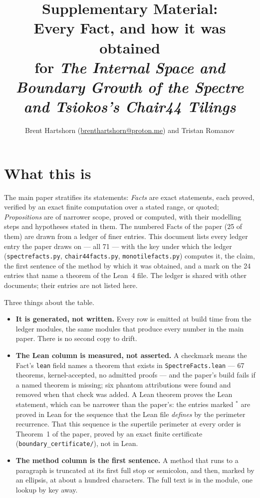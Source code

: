 \documentclass[10pt]{article}
\title{\vspace{-1cm}
\textbf{Supplementary Material:} \\ Every Fact, and how it was obtained \\
{\large for \emph{The Internal Space and Boundary Growth of the Spectre and Tsiokos's Chair44 Tilings}}}
\author{Brent Hartshorn \orcidlink{0009-0004-2853-655X}
        (\url{brenthartshorn@proton.me}) and Tristan Romanov}
\newcommand{\code}[1]{\texttt{#1}}
\begin{document}
\maketitle


\section*{What this is}

The main paper stratifies its statements: \emph{Facts} are exact statements,
each proved, verified by an exact finite computation over a stated range, or
quoted; \emph{Propositions} are of narrower scope, proved or computed, with their
modelling steps and hypotheses stated in them.  The numbered Facts of the
paper (25 of them) are drawn from a ledger of finer entries.  This document
lists every ledger entry the paper draws on --- all 71 --- with the key under
which the ledger (\code{spectrefacts.py}, \code{chair44facts.py},
\code{monotilefacts.py}) computes it, the claim, the first sentence of the
method by which it was obtained, and a mark on the 24 entries that name a
theorem of the Lean~4 file.  The ledger is shared with other documents; their
entries are not listed here.

Three things about the table.

\begin{itemize}
\item \textbf{It is generated, not written.}  Every row is emitted at build
  time from the ledger modules, the same modules that produce every
  number in the main paper.  There is no second copy to drift.

\item \textbf{The Lean column is measured, not asserted.}  A checkmark means
  the Fact's \code{lean} field names a theorem that exists in
  \code{SpectreFacts.lean} --- 67 theorems, kernel-accepted, no admitted
  proofs --- and the paper's build fails if a named theorem is missing; six
  phantom attributions were found and removed when that check was added.  A
  Lean theorem proves the Lean statement, which can be narrower than the
  paper's: the entries marked $^{*}$ are proved in Lean for the sequence that the
  Lean file \emph{defines} by the perimeter recurrence.  That this sequence
  is the supertile perimeter at every order is Theorem~1 of the paper,
  proved by an exact finite certificate
  (\code{boundary\_certificate/}), not in Lean.

\item \textbf{The method column is the first sentence.}  A method that runs
  to a paragraph is truncated at its first full stop or semicolon, and
  then, marked by an ellipsis, at about a hundred characters.  The full
  text is in the module, one lookup by key away.
\end{itemize}
\end{document}
